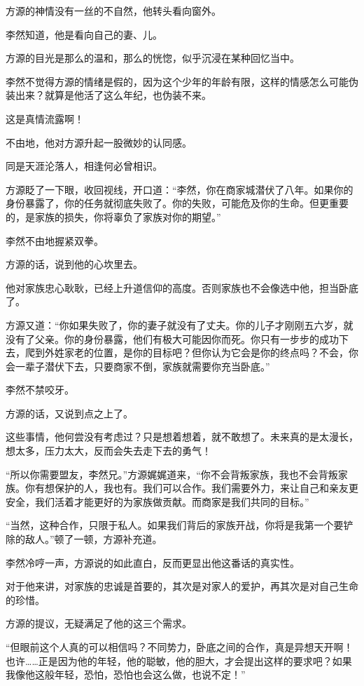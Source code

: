 \begin{this_body}
方源的神情没有一丝的不自然，他转头看向窗外。

李然知道，他是看向自己的妻、儿。

方源的目光是那么的温和，那么的恍惚，似乎沉浸在某种回忆当中。

李然不觉得方源的情绪是假的，因为这个少年的年龄有限，这样的情感怎么可能伪装出来？就算是他活了这么年纪，也伪装不来。

这是真情流露啊！

不由地，他对方源升起一股微妙的认同感。

同是天涯沦落人，相逢何必曾相识。

方源眨了一下眼，收回视线，开口道：“李然，你在商家城潜伏了八年。如果你的身份暴露了，你的任务就彻底失败了。你的失败，可能危及你的生命。但更重要的，是家族的损失，你将辜负了家族对你的期望。”

李然不由地握紧双拳。

方源的话，说到他的心坎里去。

他对家族忠心耿耿，已经上升道信仰的高度。否则家族也不会像选中他，担当卧底了。

方源又道：“你如果失败了，你的妻子就没有了丈夫。你的儿子才刚刚五六岁，就没有了父亲。你的身份暴露，他们有极大可能因你而死。你只有一步步的成功下去，爬到外姓家老的位置，是你的目标吧？但你认为它会是你的终点吗？不会，你会一辈子潜伏下去，只要商家不倒，家族就需要你充当卧底。”

李然不禁咬牙。

方源的话，又说到点之上了。

这些事情，他何尝没有考虑过？只是想着想着，就不敢想了。未来真的是太漫长，想太多，压力太大，反而会失去走下去的勇气！

“所以你需要盟友，李然兄。”方源娓娓道来，“你不会背叛家族，我也不会背叛家族。你有想保护的人，我也有。我们可以合作。我们需要外力，来让自己和亲友更安全，我们活着才能更好的为家族做贡献。而商家是我们共同的目标。”

“当然，这种合作，只限于私人。如果我们背后的家族开战，你将是我第一个要铲除的敌人。”顿了一顿，方源补充道。

李然冷哼一声，方源说的如此直白，反而更显出他这番话的真实性。

对于他来讲，对家族的忠诚是首要的，其次是对家人的爱护，再其次是对自己生命的珍惜。

方源的提议，无疑满足了他的这三个需求。

“但眼前这个人真的可以相信吗？不同势力，卧底之间的合作，真是异想天开啊！也许……正是因为他的年轻，他的聪敏，他的胆大，才会提出这样的要求吧？如果我像他这般年轻，恐怕，恐怕也会这么做，也说不定！”


\end{this_body}
